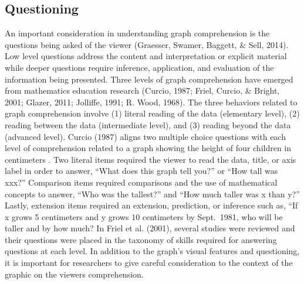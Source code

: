 \documentclass[print]{nuthesis}
\begin{document}
\hypertarget{lit-questioning}{%
\subsection{Questioning}\label{lit-questioning}}

An important consideration in understanding graph comprehension is the questions being asked of the viewer (Graesser, Swamer, Baggett, \& Sell, 2014).
Low level questions address the content and interpretation or explicit material while deeper questions require inference, application, and evaluation of the information being presented.
Three levels of graph comprehension have emerged from mathematics education research (Curcio, 1987; Friel, Curcio, \& Bright, 2001; Glazer, 2011; Jolliffe, 1991; R. Wood, 1968).
The three behaviors related to graph comprehension involve (1) literal reading of the data (elementary level), (2) reading between the data (intermediate level), and (3) reading beyond the data (advanced level).
Curcio (1987) aligns two multiple choice questions with each level of comprehension related to a graph showing the height of four children in centimeters .
Two literal items required the viewer to read the data, title, or axis label in order to answer, ``What does this graph tell you?'' or ``How tall was xxx?''
Comparison items required comparisons and the use of mathematical concepts to answer, ``Who was the tallest?'' and ``How much taller was x than y?''
Lastly, extension items required an extension, prediction, or inference such as, ``If x grows 5 centimeters and y grows 10 centimeters by Sept.~1981, who will be taller and by how much?
In Friel et al. (2001), several studies were reviewed and their questions were placed in the taxonomy of skills required for answering questions at each level.
In addition to the graph's visual features and questioning, it is important for researchers to give careful consideration to the context of the graphic on the viewers comprehension.
\end{document}
